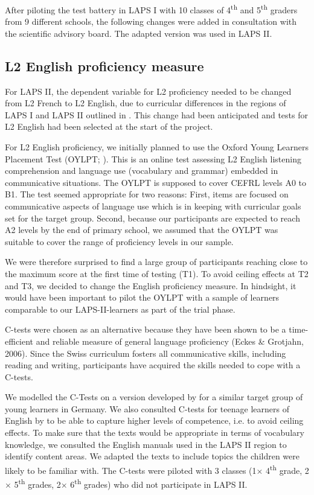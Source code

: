 \documentclass[output=paper]{langsci/langscibook}
\begin{document}
After piloting the test battery in LAPS I with 10 classes of 4\textsuperscript{th} and 5\textsuperscript{th} graders from 9 different schools, the following changes were added in consultation with the scientific advisory board. The adapted version was used in LAPS II.

\subsection{L2 English proficiency measure}

For LAPS II, the dependent variable for L2 proficiency needed to be changed from L2 French to L2 English, due to curricular differences in the regions of LAPS I and LAPS II outlined in . This change had been anticipated and tests for L2 English had been selected at the start of the project.

For L2 English proficiency, we initially planned to use the Oxford Young Learners Placement Test (OYLPT; \citealt{Testing2013}). This is an online test assessing L2 English listening comprehension and language use (vocabulary and grammar) embedded in communicative situations. The OYLPT is supposed to cover CEFRL levels A0 to B1. The test seemed appropriate for two reasons: First, items are focused on communicative aspects of language use which is in keeping with curricular goals set for the target group. Second, because our participants are expected to reach A2 levels by the end of primary school, we assumed that the OYLPT was suitable to cover the range of proficiency levels in our sample. 

We were therefore surprised to find a large group of participants reaching close to the maximum score at the first time of testing (T1). To avoid ceiling effects at T2 and T3, we decided to change the English proficiency measure. In hindsight, it would have been important to pilot the OYLPT with a sample of learners comparable to our LAPS-II-learners as part of the trial phase. 

C-tests were chosen as an alternative because they have been shown to be a time-efficient and reliable measure of general language proficiency (Eckes \& Grotjahn, 2006). Since the Swiss curriculum fosters all communicative skills, including reading and writing, participants have acquired the skills needed to cope with a C-tests. 

We modelled the C-Tests on a version developed by \citet{WildenPorsch2017} for a similar target group of young learners in Germany. We also consulted C-tests for teenage learners of English by \citet{BabaiiShahri2010} to be able to capture higher levels of competence, i.e. to avoid ceiling effects. To make sure that the texts would be appropriate in terms of vocabulary knowledge, we consulted the English manuals used in the LAPS II region to identify content areas. We adapted the texts to include topics the children were likely to be familiar with. The C-tests were piloted with 3 classes (1× 4\textsuperscript{th} grade, 2 × 5\textsuperscript{th} grades, 2× 6\textsuperscript{th} grades) who did not participate in LAPS II. 
\end{document}
